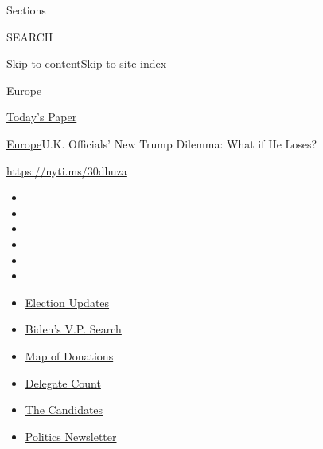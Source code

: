 Sections

SEARCH

\protect\hyperlink{site-content}{Skip to
content}\protect\hyperlink{site-index}{Skip to site index}

\href{https://www.nytimes.com/section/world/europe}{Europe}

\href{https://myaccount.nytimes.com/auth/login?response_type=cookie\&client_id=vi}{}

\href{https://www.nytimes.com/section/todayspaper}{Today's Paper}

\href{/section/world/europe}{Europe}\textbar{}U.K. Officials' New Trump
Dilemma: What if He Loses?

\url{https://nyti.ms/30dhuza}

\begin{itemize}
\item
\item
\item
\item
\item
\item
\end{itemize}

\begin{itemize}
\item
  \href{https://www.nytimes.com/2020/07/31/us/elections/biden-vs-trump.html?action=click\&pgtype=Article\&state=default\&region=TOP_BANNER\&context=storylines_menu}{Election
  Updates}
\item
  \href{https://www.nytimes.com/article/biden-vice-president-2020.html?action=click\&pgtype=Article\&state=default\&region=TOP_BANNER\&context=storylines_menu}{Biden's
  V.P. Search}
\item
  \href{https://www.nytimes.com/interactive/2020/07/24/us/politics/trump-biden-campaign-donors.html?action=click\&pgtype=Article\&state=default\&region=TOP_BANNER\&context=storylines_menu}{Map
  of Donations}
\item
  \href{https://www.nytimes.com/interactive/2020/us/elections/delegate-count-primary-results.html?action=click\&pgtype=Article\&state=default\&region=TOP_BANNER\&context=storylines_menu}{Delegate
  Count}
\item
  \href{https://www.nytimes.com/interactive/2019/us/politics/2020-presidential-candidates.html?action=click\&pgtype=Article\&state=default\&region=TOP_BANNER\&context=storylines_menu}{The
  Candidates}
\item
  \href{https://www.nytimes.com/newsletters/politics?action=click\&pgtype=Article\&state=default\&region=TOP_BANNER\&context=storylines_menu}{Politics
  Newsletter}
\end{itemize}

